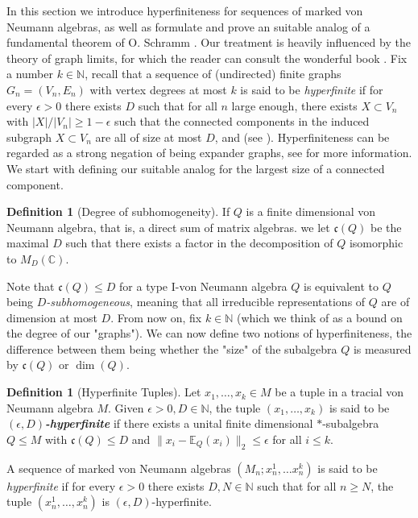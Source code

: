 \documentclass[11pt]{amsart}
\newcommand{\N}{{\mathbb{N}}}
\newcommand{\C}{{\mathbb{C}}}
\newcommand{\fc}{\mathfrak{c}}
\theoremstyle{definition}
\newtheorem{definition}[theorem]{Definition}
\theoremstyle{remark}
\theoremstyle{definition}
\begin{document}
In this section we introduce hyperfiniteness for sequences of marked von Neumann algebras, as well as formulate and prove an suitable analog of a fundamental theorem of O. Schramm  \cite{Schramm}.
Our treatment is heavily influenced by the theory of graph limits, for which the reader can consult the wonderful book \cite{zbMATH06122804}.
Fix a number $k \in \N$, recall that a sequence of (undirected) finite graphs $G_n = (V_n, E_n)$ with vertex degrees at most $k$ is said to be \emph{hyperfinite}  if for every $\epsilon > 0$ there exists $D$ such that for all $n$ large enough, there exists $X \subset V_n$ with  $|X | / |V_n | \geq 1- \epsilon$ such that the connected components in the induced subgraph $X\subset V_n$ are all of size at most $D$, and (see \cite{Elek}).
Hyperfiniteness can be regarded as a strong negation of being expander graphs, see \cite[Chapter 21]{zbMATH06122804} for more information.
We start with defining our suitable analog for the largest size of a connected component.

\begin{definition}[Degree of subhomogeneity]
If $Q$ is a finite dimensional von Neumann algebra, that is, a direct sum of matrix algebras.
we let $\mathfrak c(Q)$ be the maximal $D$ such that there exists a factor in the decomposition of $Q$ isomorphic to $M_D(\C)$.
\end{definition}

Note that $\mathfrak c(Q) \leq D$ for a type I-von Neumann algebra $Q$ is equivalent to $Q$ being \emph{$D$-subhomogeneous}, meaning that all irreducible representations of $Q$ are of dimension at most $D$.
From now on, fix $k \in \N$ (which we think of as a bound on the degree of our "graphs"). 
We can now define two notions of hyperfiniteness, the difference between them being whether the "size" of the subalgebra $Q$ is measured by $\fc(Q)$ or $\dim(Q)$. 

\begin{definition}[Hyperfinite Tuples]\label{def:hyperfinite tuple}
Let $x_1, \dots, x_k \in M$ be a tuple in a tracial von Neumann algebra $M$.
Given $\epsilon>0, D \in \N$, the tuple $(x_1, \dots, x_k)$ is said to be \textbf{\emph{$(\epsilon,D)$-hyperfinite}} if  there exists a unital finite dimensional $*$-subalgebra $Q \leq  M$ with $\fc(Q) \leq D$ and $\| x_i - \mathbb E_Q(x_i) \|_2 \leq \epsilon$ for all $i \leq k$.

    A sequence of marked von Neumann algebras $( M_n; x_n^1, \dots x_n^k)$ is said to be \emph{hyperfinite} if for every $\epsilon > 0$ there exists $D,N \in \N$ such that for all $n \geq N$, the tuple $(x_n^1, \dots, x_n^k)$ is $(\epsilon, D)$-hyperfinite.
\end{definition}
\end{document}
